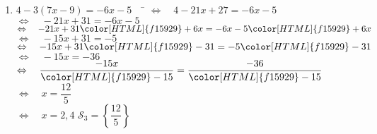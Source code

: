 \documentclass[a4paper,11pt,exos]{nsi} %
\begin{document}
\begin{enumerate}
    
    \item 	\begin{tabbing}
        $ 4-3(7x-9)=-6x-5\quad$		\=	$\Leftrightarrow\quad 4-21x+27=-6x-5 $\\
        \>	$\Leftrightarrow\quad	-21x+31=-6x-5 $\\
        \>	$\Leftrightarrow\quad	-21x+31{\color[HTML]{f15929}+6x}=-6x-5{\color[HTML]{f15929}+6x} $\\[.5em]
        \>	$\Leftrightarrow\quad	-15x+31=-5 $\\[.5em]
        \>	$\Leftrightarrow\quad	-15x+31{\color[HTML]{f15929}-31}=-5{\color[HTML]{f15929}-31} $\\[.5em]
        \>	$\Leftrightarrow\quad	-15x=-36 $\\[.5em]
        \>	$\Leftrightarrow\quad	\dfrac{-15x}{\color[HTML]{f15929}-15}=\dfrac{-36}{\color[HTML]{f15929}-15} $\\[.5em]
        \>	$\Leftrightarrow\quad	x=\dfrac{12}{5} $\\
        \>	$\Leftrightarrow\quad	x=2,4 $ \hspace{4cm} $\mathcal{S}_3=\left\{ \dfrac{12}{5} \right\}$
    \end{tabbing}
\end{enumerate}
\end{document}
